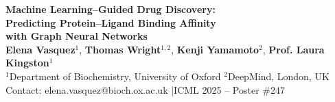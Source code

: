 \documentclass[a0paper,portrait]{article}
\begin{document}

\vspace*{-1cm}
\begin{center}
  {\color{white}\fontsize{80}{96}\selectfont\bfseries
  Machine Learning--Guided Drug Discovery:\\[0.4cm]
  Predicting Protein--Ligand Binding Affinity\\[0.4cm]
  with Graph Neural Networks}\\[2cm]
  {\color{white}\fontsize{40}{48}\selectfont
  \textbf{Elena Vasquez}$^1$, \textbf{Thomas Wright}$^{1,2}$, \textbf{Kenji Yamamoto}$^2$, \textbf{Prof. Laura Kingston}$^1$}\\[1cm]
  {\color{white!85}\fontsize{34}{42}\selectfont
  $^1$Department of Biochemistry, University of Oxford \quad\quad
  $^2$DeepMind, London, UK}\\[0.6cm]
  {\color{accentblue!40}\fontsize{30}{36}\selectfont
  Contact: elena.vasquez@bioch.ox.ac.uk \quad|\quad ICML 2025 -- Poster \#247}
\end{center}

\vspace{3cm}
\end{document}
